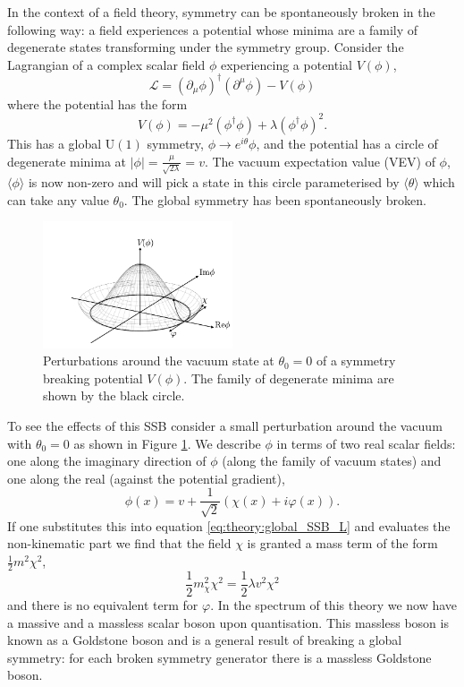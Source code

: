 In the context of a field theory, symmetry can be spontaneously broken in the following way: a field experiences a potential whose minima are a family of degenerate states transforming under the symmetry group. 
Consider the Lagrangian of a complex scalar field $\phi$ experiencing a potential $V(\phi)$,
\begin{equation}
    \label{eq:theory:global_SSB_L}
    \mathcal{L} = (\partial_{\mu}\phi)^{\dag}(\partial^{\mu}\phi) - V(\phi)
\end{equation}
where the potential has the form
\begin{equation}
    \label{eq:theory:global_u1_potential}
    V(\phi) = -\mu^{2}(\phi^{\dag}\phi) + \lambda(\phi^{\dag}\phi)^{2}.
\end{equation}
This has a global $\mathrm{U}(1)$ symmetry, $\phi\rightarrow{e^{i\theta}}\phi$, and the potential has a circle of degenerate minima at $|\phi| = \frac{\mu}{\sqrt{2\lambda}} = v$. 
The vacuum expectation value (VEV) of $\phi$, $\langle\phi\rangle$ is now non-zero and will pick a state in this circle parameterised by $\langle\theta\rangle$ which can take any value $\theta_{0}$. The global symmetry has been spontaneously broken.
\begin{figure}[h!]
    \includegraphics[width=0.5\textwidth]{figures/theory/ssb_potential.pdf}
    \caption{Perturbations around the vacuum state at $\theta_0=0$ of a symmetry breaking potential $V(\phi)$. The family of degenerate minima are shown by the black circle.}
    \label{fig:theory:global_ssb_potential}
\end{figure}
To see the effects of this SSB consider a small perturbation around the vacuum with $\theta_{0}=0$ as shown in Figure \ref{fig:theory:global_ssb_potential}. 
We describe $\phi$ in terms of two real scalar fields: one along the imaginary direction of $\phi$ (along the family of vacuum states) and one along the real (against the potential gradient),
\begin{equation}
    \phi(x) = v + \frac{1}{\sqrt{2}}(\chi(x) + i\varphi(x)).
\end{equation}
If one substitutes this into equation \ref{eq:theory:global_SSB_L} and evaluates the non-kinematic part we find that the field $\chi$ is granted a mass term of the form $\frac{1}{2}m^{2}\chi^{2}$,
\begin{equation}
    \frac{1}{2}m_{\chi}^{2}\chi^{2} = \frac{1}{2}{\lambda}v^{2}\chi^{2}
\end{equation}
and there is no equivalent term for $\varphi$. In the spectrum of this theory we now have a massive and a massless scalar boson upon quantisation. This massless boson is known as a Goldstone boson and is a general result of breaking a global symmetry: for each broken symmetry generator there is a massless Goldstone boson. 

